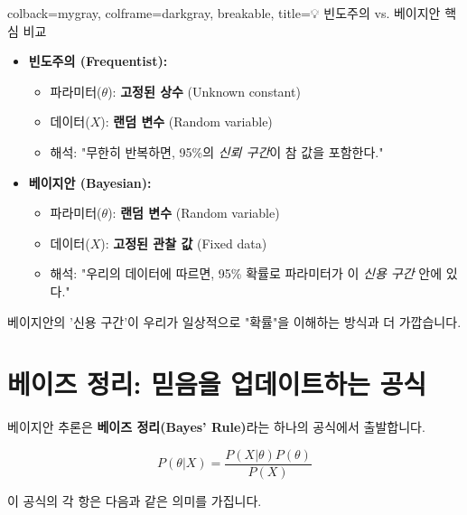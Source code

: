 \documentclass[11pt,a4paper]{book}
\theoremstyle{definition}
\begin{document}
\begin{tcolorbox}{colback=mygray, colframe=darkgray, breakable, title=💡 빈도주의 vs. 베이지안 핵심 비교}
    \begin{itemize}
        \item \textbf{빈도주의 (Frequentist):}
            \begin{itemize}
                \item 파라미터($\theta$): \textbf{고정된 상수} (Unknown constant)
                \item 데이터($X$): \textbf{랜덤 변수} (Random variable)
                \item 해석: "무한히 반복하면, 95\%의 \textit{신뢰 구간}이 참 값을 포함한다."
            \end{itemize}
        \item \textbf{베이지안 (Bayesian):}
            \begin{itemize}
                \item 파라미터($\theta$): \textbf{랜덤 변수} (Random variable)
                \item 데이터($X$): \textbf{고정된 관찰 값} (Fixed data)
                \item 해석: "우리의 데이터에 따르면, 95\% 확률로 파라미터가 이 \textit{신용 구간} 안에 있다."
            \end{itemize}
    \end{itemize}
    베이지안의 '신용 구간'이 우리가 일상적으로 "확률"을 이해하는 방식과 더 가깝습니다.
\end{tcolorbox}


\section{베이즈 정리: 믿음을 업데이트하는 공식}

베이지안 추론은 \textbf{베이즈 정리(Bayes' Rule)}라는 하나의 공식에서 출발합니다.

$$ P(\theta | X) = \frac{P(X | \theta) P(\theta)}{P(X)} $$

이 공식의 각 항은 다음과 같은 의미를 가집니다.
\end{document}
